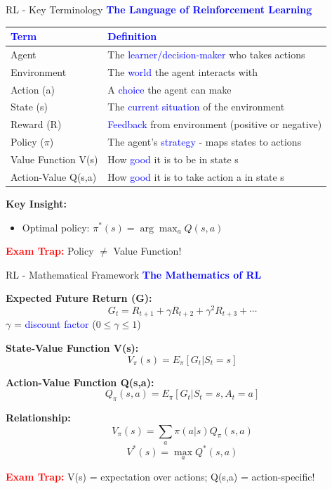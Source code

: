 \documentclass[8pt]{beamer}
\begin{document}
	\begin{frame}{RL - Key Terminology}
		\fontsize{6.5}{7.5}\selectfont
		\textcolor{blue}{\textbf{The Language of Reinforcement Learning}}
		
		\begin{tabular}{|p{2.5cm}|p{5.5cm}|}
			\hline
			\textcolor{blue}{Term} & \textcolor{blue}{Definition} \\
			\hline
			Agent & The \textcolor{blue}{learner/decision-maker} who takes actions \\
			\hline
			Environment & The \textcolor{blue}{world} the agent interacts with \\
			\hline
			Action (a) & A \textcolor{blue}{choice} the agent can make \\
			\hline
			State (s) & The \textcolor{blue}{current situation} of the environment \\
			\hline
			Reward (R) & \textcolor{blue}{Feedback} from environment (positive or negative) \\
			\hline
			Policy ($\pi$) & The agent's \textcolor{blue}{strategy} - maps states to actions \\
			\hline
			Value Function V(s) & How \textcolor{blue}{good} it is to be in state s \\
			\hline
			Action-Value Q(s,a) & How \textcolor{blue}{good} it is to take action a in state s \\
			\hline
		\end{tabular}
		
		\textbf{Key Insight:}
		\begin{itemize}
			\item Optimal policy: $\pi^*(s) = \arg\max_a Q(s,a)$
		\end{itemize}
		
		\textcolor{red}{\textbf{Exam Trap:}} Policy $\neq$ Value Function!
	\end{frame}
	
	\begin{frame}{RL - Mathematical Framework}
		\fontsize{6.5}{7.5}\selectfont
		\textcolor{blue}{\textbf{The Mathematics of RL}}
		
		\textbf{Expected Future Return (G):}
		\[
		G_t = R_{t+1} + \gamma R_{t+2} + \gamma^2 R_{t+3} + \cdots
		\]
		$\gamma$ = \textcolor{blue}{discount factor} ($0 \leq \gamma \leq 1$)
		
		\textbf{State-Value Function V(s):}
		\[
		V_\pi(s) = E_\pi[G_t | S_t = s]
		\]
		
		\textbf{Action-Value Function Q(s,a):}
		\[
		Q_\pi(s,a) = E_\pi[G_t | S_t = s, A_t = a]
		\]
		
		\textbf{Relationship:}
		\[
		V_\pi(s) = \sum_a \pi(a|s) Q_\pi(s,a)
		\]
		\[
		V^*(s) = \max_a Q^*(s,a)
		\]
		
		\textcolor{red}{\textbf{Exam Trap:}} V(s) = expectation over actions; Q(s,a) = action-specific!
	\end{frame}
	
\end{document}
